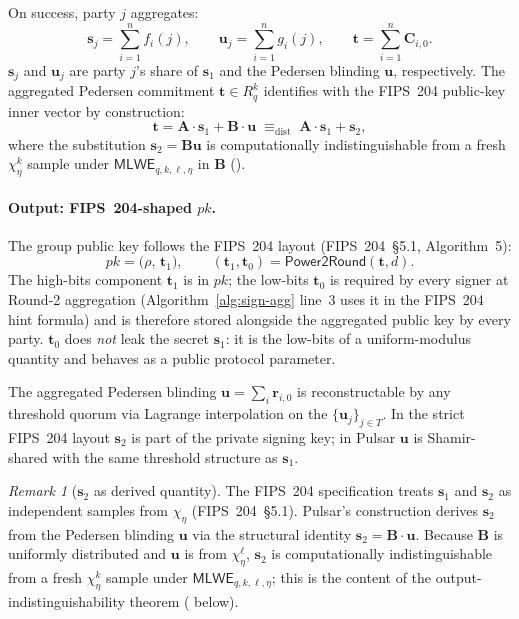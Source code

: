 \documentclass[11pt,a4paper]{article}
\theoremstyle{definition}
\theoremstyle{remark}
\newtheorem{remark}{Remark}
\newcommand{\Rq}{R_q}
\newcommand{\MLWE}{\mathsf{MLWE}}
\newcommand{\Power}{\mathsf{Power2Round}}
\begin{document}
On success, party $j$ aggregates:
\[
\mathbf{s}_j = \sum_{i=1}^n f_i(j), \qquad
\mathbf{u}_j = \sum_{i=1}^n g_i(j), \qquad
\mathbf{t} = \sum_{i=1}^n \mathbf{C}_{i,0}.
\]
$\mathbf{s}_j$ and $\mathbf{u}_j$ are party $j$'s share of $\mathbf{s}_1$
and the Pedersen blinding $\mathbf{u}$, respectively. The aggregated
Pedersen commitment $\mathbf{t} \in \Rq^k$ identifies with the FIPS~204
public-key inner vector by construction:
\[
\mathbf{t} = \mathbf{A} \cdot \mathbf{s}_1 + \mathbf{B} \cdot \mathbf{u}
\;\equiv_{\mathrm{dist}}\;
\mathbf{A} \cdot \mathbf{s}_1 + \mathbf{s}_2,
\]
where the substitution $\mathbf{s}_2 = \mathbf{B}\mathbf{u}$ is
computationally indistinguishable from a fresh
$\chi_\eta^k$ sample under $\MLWE_{q,k,\ell,\eta}$ in $\mathbf{B}$
().

\paragraph{Output: FIPS~204-shaped $\mathit{pk}$.}
The group public key follows the FIPS~204 layout
(FIPS~204~\S5.1, Algorithm~5):
\[
\mathit{pk} = \bigl(\rho,\,\mathbf{t}_1\bigr), \qquad
(\mathbf{t}_1, \mathbf{t}_0) = \Power(\mathbf{t}, d).
\]
The high-bits component $\mathbf{t}_1$ is in $\mathit{pk}$; the low-bits
$\mathbf{t}_0$ is required by every signer at Round-2 aggregation
(Algorithm~\ref{alg:sign-agg} line~3 uses it in the FIPS~204 hint
formula) and is therefore stored alongside the aggregated public key
by every party. $\mathbf{t}_0$ does \emph{not} leak the secret
$\mathbf{s}_1$: it is the low-bits of a uniform-modulus quantity and
behaves as a public protocol parameter.

The aggregated Pedersen blinding $\mathbf{u} = \sum_i \mathbf{r}_{i,0}$
is reconstructable by any threshold quorum via Lagrange interpolation
on the $\{\mathbf{u}_j\}_{j \in T}$. In the strict FIPS~204 layout
$\mathbf{s}_2$ is part of the private signing key; in Pulsar
$\mathbf{u}$ is Shamir-shared with the same threshold structure as
$\mathbf{s}_1$.

\begin{remark}[$\mathbf{s}_2$ as derived quantity]
The FIPS~204 specification treats $\mathbf{s}_1$ and $\mathbf{s}_2$
as independent samples from $\chi_\eta$ (FIPS~204~\S5.1). Pulsar's
construction derives $\mathbf{s}_2$ from the Pedersen blinding
$\mathbf{u}$ via the structural identity
$\mathbf{s}_2 = \mathbf{B} \cdot \mathbf{u}$. Because $\mathbf{B}$ is
uniformly distributed and $\mathbf{u}$ is from $\chi_\eta^\ell$,
$\mathbf{s}_2$ is computationally indistinguishable from a fresh
$\chi_\eta^k$ sample under $\MLWE_{q, k, \ell, \eta}$; this is the
content of the output-indistinguishability theorem
( below).
\end{remark}
\end{document}
